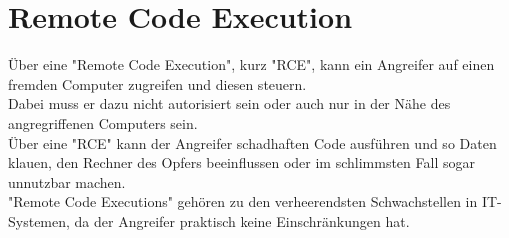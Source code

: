 \section{Remote Code Execution}\label{sec:remote-code-execution}

Über eine "Remote Code Execution", kurz "RCE", kann ein Angreifer auf einen fremden Computer zugreifen und diesen steuern.\\

Dabei muss er dazu nicht autorisiert sein oder auch nur in der Nähe des angregriffenen Computers sein.\\

Über eine "RCE" kann der Angreifer schadhaften Code ausführen und so Daten klauen, den Rechner des Opfers beeinflussen oder im schlimmsten Fall sogar unnutzbar machen.\\

"Remote Code Executions" gehören zu den verheerendsten Schwachstellen in IT-Systemen, da der Angreifer praktisch keine Einschränkungen hat.
